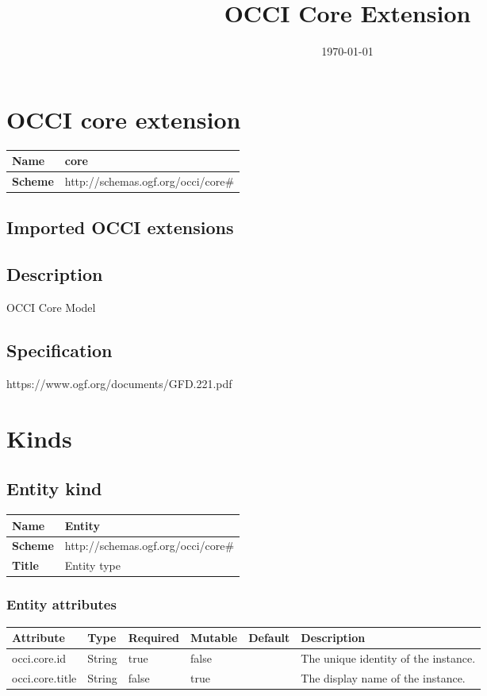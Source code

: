 \documentclass{article}
\title{OCCI Core Extension} %
\author{\textsc{}} %
\date{\today} %
\begin{document}
 

\maketitle %
\newpage
\section{OCCI core extension}
\begin{center}
\begin{tabular}{|l|l|}
  \hline
  \textbf{Name} & core \\
  \hline  
  \textbf{Scheme} & http://schemas.ogf.org/occi/core\# \\
  \hline
\end{tabular}
\end{center}
\subsection{Imported OCCI extensions}


\subsection{Description}
OCCI Core Model
\subsection{Specification}
https://www.ogf.org/documents/GFD.221.pdf
\section{Kinds}
\subsection{Entity kind}
\begin{center}
\begin{tabular}{|l|l|}
  \hline
  \textbf{Name} & Entity \\
  \hline  
  \textbf{Scheme} & http://schemas.ogf.org/occi/core\# \\
  \hline
  \textbf{Title} & Entity type \\
  \hline
\end{tabular}
\end{center}
\subsubsection{Entity attributes}
\begin{tabularx}{\textwidth}{|l|l|p{1.4cm}|p{1.3cm}|l|X|}
  \hline
  \textbf{Attribute} & \textbf{Type} & \textbf{Required} & \textbf{Mutable} & \textbf{Default} & \textbf{Description} \\
  \hline  
  occi.core.id & String & true & false &  & The unique identity of the instance. \\
  \hline
  occi.core.title & String & false & true &  & The display name of the instance. \\
  \hline
\end{tabularx}
\end{document}
